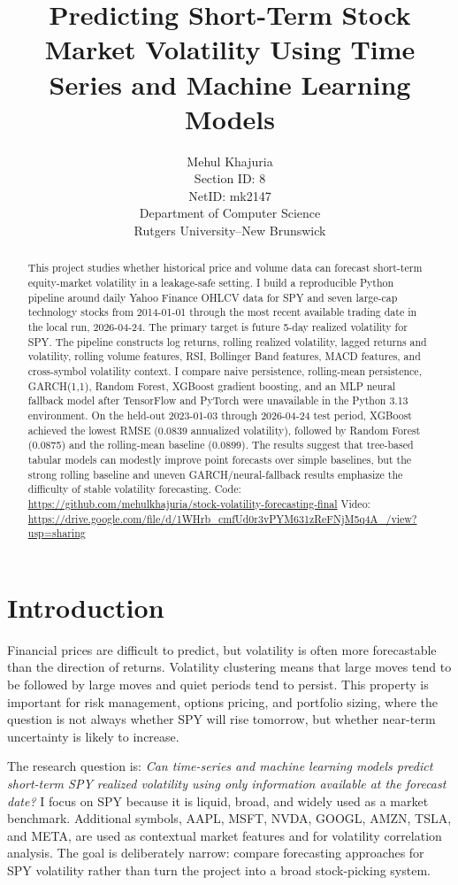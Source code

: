 \documentclass{article}
\title{Predicting Short-Term Stock Market Volatility Using Time Series and Machine Learning Models}
\author{%
  Mehul Khajuria \\
  Section ID: 8 \\
  NetID: mk2147 \\
  Department of Computer Science \\
  Rutgers University--New Brunswick
}
\begin{document}
\maketitle

\begin{abstract}
This project studies whether historical price and volume data can forecast short-term equity-market volatility in a leakage-safe setting. I build a reproducible Python pipeline around daily Yahoo Finance OHLCV data for SPY and seven large-cap technology stocks from 2014-01-01 through the most recent available trading date in the local run, 2026-04-24. The primary target is future 5-day realized volatility for SPY. The pipeline constructs log returns, rolling realized volatility, lagged returns and volatility, rolling volume features, RSI, Bollinger Band features, MACD features, and cross-symbol volatility context. I compare naive persistence, rolling-mean persistence, GARCH(1,1), Random Forest, XGBoost gradient boosting, and an MLP neural fallback model after TensorFlow and PyTorch were unavailable in the Python 3.13 environment. On the held-out 2023-01-03 through 2026-04-24 test period, XGBoost achieved the lowest RMSE (0.0839 annualized volatility), followed by Random Forest (0.0875) and the rolling-mean baseline (0.0899). The results suggest that tree-based tabular models can modestly improve point forecasts over simple baselines, but the strong rolling baseline and uneven GARCH/neural-fallback results emphasize the difficulty of stable volatility forecasting. Code: \url{https://github.com/mehulkhajuria/stock-volatility-forecasting-final} Video: \url{https://drive.google.com/file/d/1WHrb_cmfUd0r3vPYM631zReFNjM5q4A_/view?usp=sharing}
\end{abstract}

\section{Introduction}
Financial prices are difficult to predict, but volatility is often more forecastable than the direction of returns. Volatility clustering means that large moves tend to be followed by large moves and quiet periods tend to persist. This property is important for risk management, options pricing, and portfolio sizing, where the question is not always whether SPY will rise tomorrow, but whether near-term uncertainty is likely to increase.

The research question is: \emph{Can time-series and machine learning models predict short-term SPY realized volatility using only information available at the forecast date?} I focus on SPY because it is liquid, broad, and widely used as a market benchmark. Additional symbols, AAPL, MSFT, NVDA, GOOGL, AMZN, TSLA, and META, are used as contextual market features and for volatility correlation analysis. The goal is deliberately narrow: compare forecasting approaches for SPY volatility rather than turn the project into a broad stock-picking system.
\end{document}
